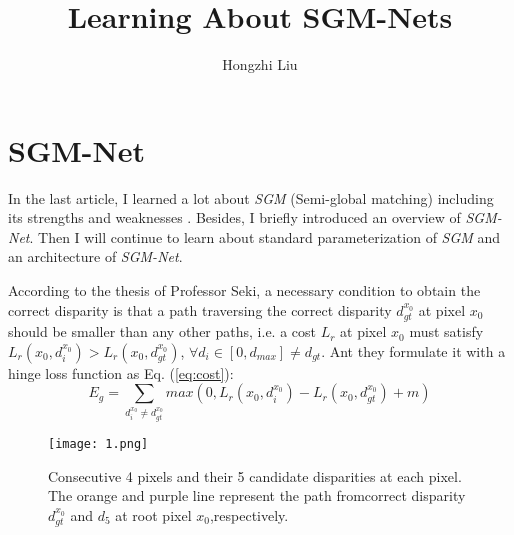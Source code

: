 \documentclass[twocolumn]{article}
\author{Hongzhi Liu}
\title{Learning About SGM-Nets \uppercase\expandafter{\romannumeral2}}
\begin{document}
	\maketitle
	\par
	\section{SGM-Net}
	In the last article, I learned a lot about \emph{SGM} (Semi-global matching) including its strengths and weaknesses \cite{Seki2017SGM}. Besides, I briefly introduced  an overview of \emph{SGM-Net}. Then I will continue to learn about standard parameterization of \emph{SGM} and an architecture of \emph{SGM-Net}. 
	
	According to the thesis of Professor Seki, a necessary condition to obtain the correct disparity is that a path traversing the correct disparity
	$d_{gt}^{x_0}$ at pixel $x_0$ should be smaller than any other paths, i.e. a cost $L_r$ at pixel $x_0$ must satisfy $L_r \left( x_0, d_i^{x_0} \right) >L_r \left( x_0, d_{gt}^{x_0} \right)$, $\forall d_i \in \left[ 0,d_{max}\right] \ne d_{gt} $. Ant they formulate it with a hinge loss function as Eq. (\ref{eq:cost}):
	\begin{equation}
	E_g = \sum_{d_i^{x_0}\ne d_{gt}^{x_0}} max \left( 0,L_r \left( x_0, d_i^{x_0} \right) - L_r \left( x_0, d_{gt}^{x_0} \right) + m \right) \label{eq:cost}
	\end{equation}
	
    \begin{figure}[ht]
    	\centering
    	\texttt{[image: 1.png]}
    	\caption{Consecutive 4 pixels and their 5 candidate disparities at each pixel. The orange and purple line represent the path fromcorrect disparity $d_{gt}^{x_0}$ and $d_5$ at root pixel $x_0$,respectively.}\label{pathcost}
    \end{figure}
\end{document}
